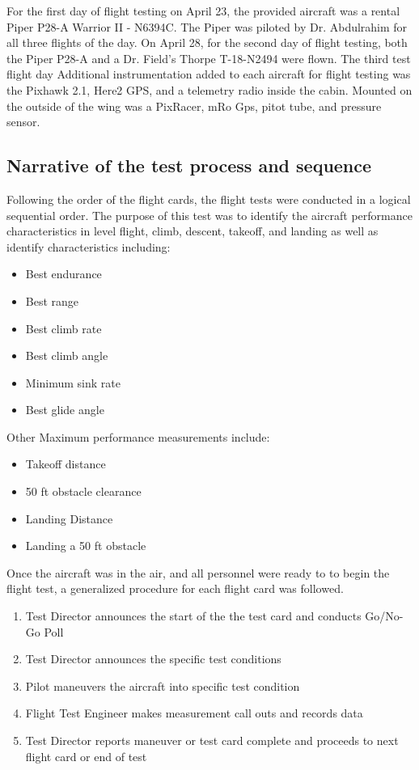 \documentclass[conf]{new-aiaa}
\begin{document}
For the first day of flight testing on April 23, the provided aircraft was a rental Piper P28-A Warrior II - N6394C. The Piper was piloted by Dr. Abdulrahim for all three flights of the day. On April 28, for the second day of flight testing, both the Piper P28-A and a Dr. Field's Thorpe T-18-N2494 were flown. The third test flight day  Additional instrumentation added to each aircraft for flight testing was the Pixhawk 2.1, Here2 GPS, and a telemetry radio inside the cabin. Mounted on the outside of the wing was a PixRacer, mRo Gps, pitot tube, and pressure sensor. 

\subsection{Narrative of the test process and sequence}

Following the order of the flight cards, the flight tests were conducted in a logical sequential order. The purpose of this test was to identify the aircraft performance characteristics in level flight, climb, descent, takeoff, and landing as well as identify characteristics including:

\begin{itemize}
\item Best endurance
\item Best range
\item Best climb rate
\item Best climb angle
\item Minimum sink rate
\item Best glide angle
\end{itemize}

\medskip
Other Maximum performance measurements include:

\begin{itemize}
\item Takeoff distance
\item 50 ft obstacle clearance
\item Landing Distance
\item Landing a 50 ft obstacle
\end{itemize}

\medskip 

Once the aircraft was in the air, and all personnel were ready to to begin the flight test, a generalized procedure for each flight card was followed. 

\medskip

\begin{enumerate}

	\item Test Director announces the start of the the test card  and conducts Go/No-Go Poll
	\item Test Director announces the specific test conditions
	\item Pilot maneuvers the aircraft into specific test condition
	\item Flight Test Engineer makes measurement call outs and records data
	\item Test Director reports maneuver or test card complete and proceeds to next flight card or end of test
\end{enumerate}
\end{document}
